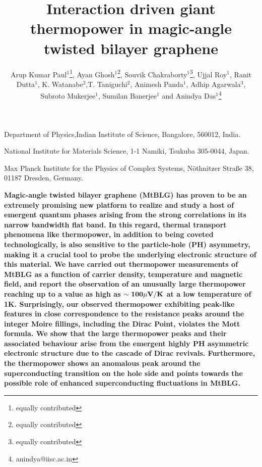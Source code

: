 \documentclass{nature}
\begin{document}
\title{Interaction driven giant thermopower in magic-angle twisted bilayer graphene}
\author{Arup Kumar Paul$^{1}$\footnote{equally contributed}, Ayan Ghosh$^{1}$\footnote{equally contributed}, Souvik Chakraborty$^{1}$\footnote{equally contributed}, Ujjal Roy$^{1}$, Ranit Dutta$^{1}$, K. Watanabe$^{2}$,T. Taniguchi$^{2}$, Animesh Panda$^1$, Adhip Agarwala$^{3}$, Subroto Mukerjee$^{1}$, Sumilan Banerjee$^{1}$ and Anindya Das$^{1}$\footnote{anindya@iisc.ac.in}}

\maketitle

\begin{affiliations}

\item Department of Physics,Indian Institute of Science, Bangalore, 560012, India.
\item National Institute for Materials Science, 1-1 Namiki, Tsukuba 305-0044, Japan.
\item Max Planck Institute for the Physics of Complex Systems,  N{\"o}thnitzer Stra\ss e 38, 01187 Dresden, Germany.

\end{affiliations}


\noindent\textbf{Magic-angle twisted bilayer graphene (MtBLG) has proven to be an extremely promising new platform to realize and study a host of emergent quantum phases arising from the strong correlations in its narrow bandwidth flat band. In this regard, thermal transport phenomena like thermopower, in addition to being coveted technologically, is also sensitive to the particle-hole (PH) asymmetry, making it a crucial tool to probe the underlying electronic structure of this material. We have carried out thermopower measurements of MtBLG as a function of carrier density, temperature and magnetic field, and report the observation of an unusually large thermopower reaching up to a value as high as $\sim \bf{100\mu V/K}$ at a low temperature of 1K. Surprisingly, our observed thermopower exhibiting peak-like features in close correspondence to the resistance peaks around the integer Moire fillings, including the Dirac Point, violates the Mott formula. %
We show that the large thermopower peaks and their %
associated behaviour arise from the emergent highly PH asymmetric electronic structure due to the cascade of Dirac revivals. Furthermore, the thermopower shows an anomalous peak around the superconducting transition on the hole side and points towards the possible role of enhanced superconducting fluctuations in MtBLG.}
\end{document}
